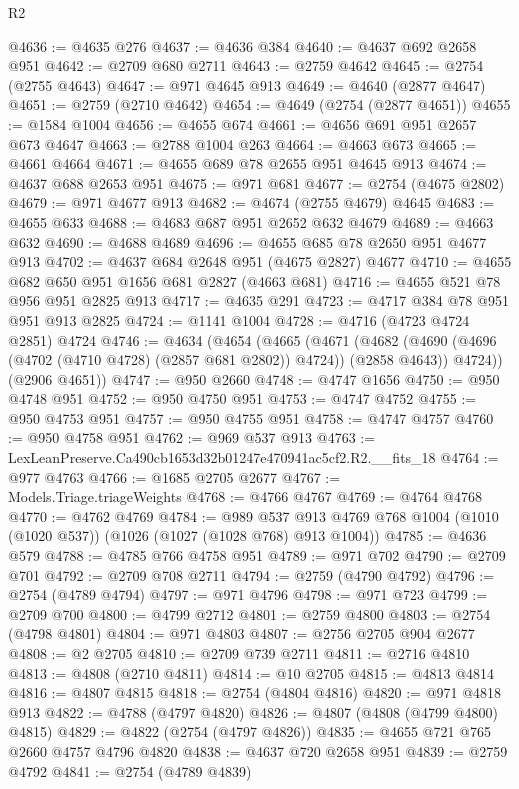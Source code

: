\begin{lexlean}{R2}
\begin{coremodule}
@4636 := @4635 @276
@4637 := @4636 @384
@4640 := @4637 @692 @2658 @951
@4642 := @2709 @680 @2711
@4643 := @2759 @4642
@4645 := @2754 (@2755 @4643)
@4647 := @971 @4645 @913
@4649 := @4640 (@2877 @4647)
@4651 := @2759 (@2710 @4642)
@4654 := @4649 (@2754 (@2877 @4651))
@4655 := @1584 @1004
@4656 := @4655 @674
@4661 := @4656 @691 @951 @2657 @673 @4647
@4663 := @2788 @1004 @263
@4664 := @4663 @673
@4665 := @4661 @4664
@4671 := @4655 @689 @78 @2655 @951 @4645 @913
@4674 := @4637 @688 @2653 @951
@4675 := @971 @681
@4677 := @2754 (@4675 @2802)
@4679 := @971 @4677 @913
@4682 := @4674 (@2755 @4679) @4645
@4683 := @4655 @633
@4688 := @4683 @687 @951 @2652 @632 @4679
@4689 := @4663 @632
@4690 := @4688 @4689
@4696 := @4655 @685 @78 @2650 @951 @4677 @913
@4702 := @4637 @684 @2648 @951 (@4675 @2827) @4677
@4710 := @4655 @682 @650 @951 @1656 @681 @2827 (@4663 @681)
@4716 := @4655 @521 @78 @956 @951 @2825 @913
@4717 := @4635 @291
@4723 := @4717 @384 @78 @951 @951 @913 @2825
@4724 := @1141 @1004
@4728 := @4716 (@4723 @4724 @2851) @4724
@4746 := @4634
    (@4654
      (@4665
        (@4671
          (@4682 (@4690 (@4696 (@4702 (@4710 @4728) (@2857 @681 @2802)) @4724)) (@2858 @4643))
          @4724))
      (@2906 @4651))
@4747 := @950 @2660
@4748 := @4747 @1656
@4750 := @950 @4748 @951
@4752 := @950 @4750 @951
@4753 := @4747 @4752
@4755 := @950 @4753 @951
@4757 := @950 @4755 @951
@4758 := @4747 @4757
@4760 := @950 @4758 @951
@4762 := @969 @537 @913
@4763 := LexLeanPreserve.Ca490cb1653d32b01247e470941ac5cf2.R2.__fits_18
@4764 := @977 @4763
@4766 := @1685 @2705 @2677
@4767 := Models.Triage.triageWeights
@4768 := @4766 @4767
@4769 := @4764 @4768
@4770 := @4762 @4769
@4784 := @989
    @537
    @913
    @4769
    @768
    @1004
    (@1010 (@1020 @537))
    (@1026 (@1027 (@1028 @768) @913 @1004))
@4785 := @4636 @579
@4788 := @4785 @766 @4758 @951
@4789 := @971 @702
@4790 := @2709 @701
@4792 := @2709 @708 @2711
@4794 := @2759 (@4790 @4792)
@4796 := @2754 (@4789 @4794)
@4797 := @971 @4796
@4798 := @971 @723
@4799 := @2709 @700
@4800 := @4799 @2712
@4801 := @2759 @4800
@4803 := @2754 (@4798 @4801)
@4804 := @971 @4803
@4807 := @2756 @2705 @904 @2677
@4808 := @2 @2705
@4810 := @2709 @739 @2711
@4811 := @2716 @4810
@4813 := @4808 (@2710 @4811)
@4814 := @10 @2705
@4815 := @4813 @4814
@4816 := @4807 @4815
@4818 := @2754 (@4804 @4816)
@4820 := @971 @4818 @913
@4822 := @4788 (@4797 @4820)
@4826 := @4807 (@4808 (@4799 @4800) @4815)
@4829 := @4822 (@2754 (@4797 @4826))
@4835 := @4655 @721 @765 @2660 @4757 @4796 @4820
@4838 := @4637 @720 @2658 @951
@4839 := @2759 @4792
@4841 := @2754 (@4789 @4839)

\end{coremodule}
\end{lexlean}
